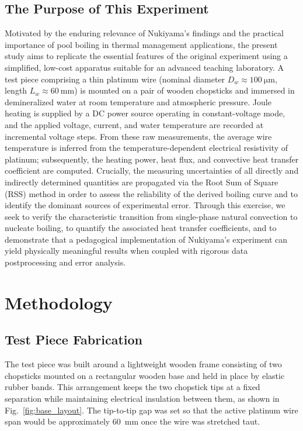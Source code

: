 \documentclass[conference]{IEEEtran}
\begin{document}
\subsection{The Purpose of This Experiment}
Motivated by the enduring relevance of Nukiyama's findings and the practical importance of pool boiling in thermal management applications, the present study aims to replicate the essential features of the original experiment using a simplified, low-cost apparatus suitable for an advanced teaching laboratory. A test piece comprising a thin platinum wire (nominal diameter $D_w \approx 100~\mathrm{\mu m}$, length $L_w \approx 60~\mathrm{mm}$) is mounted on a pair of wooden chopsticks and immersed in demineralized water at room temperature and atmospheric pressure. Joule heating is supplied by a DC power source operating in constant-voltage mode, and the applied voltage, current, and water temperature are recorded at incremental voltage steps. From these raw measurements, the average wire temperature is inferred from the temperature-dependent electrical resistivity of platinum; subsequently, the heating power, heat flux, and convective heat transfer coefficient are computed. Crucially, the measuring uncertainties of all directly and indirectly determined quantities are propagated via the Root Sum of Square (RSS) method in order to assess the reliability of the derived boiling curve and to identify the dominant sources of experimental error. Through this exercise, we seek to verify the characteristic transition from single-phase natural convection to nucleate boiling, to quantify the associated heat transfer coefficients, and to demonstrate that a pedagogical implementation of Nukiyama's experiment can yield physically meaningful results when coupled with rigorous data postprocessing and error analysis.

\section{Methodology}

\subsection{Test Piece Fabrication}
The test piece was built around a lightweight wooden frame consisting of two chopsticks mounted on a rectangular wooden base and held in place by elastic rubber bands. This arrangement keeps the two chopstick tips at a fixed separation while maintaining electrical insulation between them, as shown in Fig.~\ref{fig:base_layout}. The tip-to-tip gap was set so that the active platinum wire span would be approximately 60~mm once the wire was stretched taut.
\end{document}
